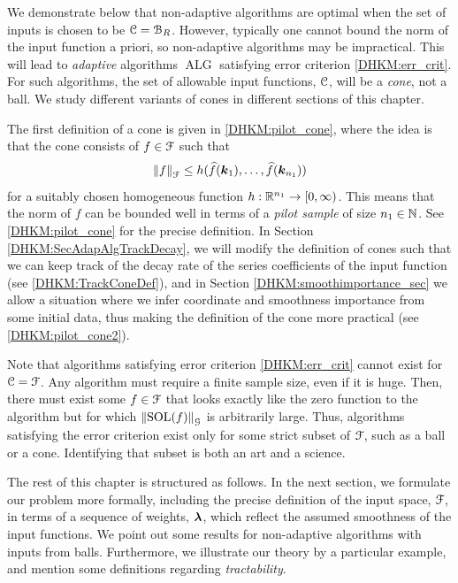 \documentclass[USenglish]{article}
\theoremstyle{dgthm}
\theoremstyle{dgthm}
\theoremstyle{dgthm}
\theoremstyle{dgthm}
\theoremstyle{dgdef}
\theoremstyle{definition}
\DeclareMathOperator{\DHKMSOL}{SOL}
\DeclareMathOperator{\DHKMALG}{ALG}
\newcommand{\DHKMhf}{\widehat{f}}
\newcommand{\DHKMnorm}[2][{}]{\ensuremath{\left \lVert #2 \right \rVert}_{#1}}
\begin{document}
We demonstrate below that non-adaptive algorithms are optimal when the set of inputs is chosen to be ${\mathcal{C}} = {\mathcal{B}}_R$. However, typically one cannot bound the norm of the input function a priori, so non-adaptive algorithms may be impractical. 
This will lead to \emph{adaptive} algorithms $\DHKMALG$ satisfying error criterion \eqref{DHKM:err_crit}.  For such algorithms, the set of allowable input functions, ${\mathcal{C}}$, will be a \emph{cone}, not a ball. We study different variants of cones in different sections of this chapter. 

The first definition of a cone is given in \eqref{DHKM:pilot_cone}, 
where the idea is that the cone consists of $f\in{\mathcal{F}}$ such that 
$$
  \DHKMnorm[\calF]{f}\le h (\DHKMhf(\bsk_1),\ldots,\DHKMhf (\bsk_{n_1}))
$$
for a suitably chosen homogeneous function $h:{\mathbb{R}}^{n_1}\rightarrow [0,\infty)$. This means that the norm of $f$ can be bounded well in terms of 
a \emph{pilot sample} of size $n_1\in{\mathbb{N}}$. See \eqref{DHKM:pilot_cone} for the precise definition. In Section \ref{DHKM:SecAdapAlgTrackDecay}, we will modify the definition of cones such that we can keep track of the decay rate of the series coefficients of the input function (see \eqref{DHKM:TrackConeDef}), 
and in Section \ref{DHKM:smoothimportance_sec} we allow a situation 
where we infer coordinate and smoothness importance from some initial data, thus making the definition of the cone more practical (see  
\eqref{DHKM:pilot_cone2}).

Note that algorithms satisfying error criterion \eqref{DHKM:err_crit} cannot exist for ${\mathcal{C}} = {\mathcal{F}}$. Any algorithm must require a finite sample size, even if it is huge.  Then, there must exist some $f \in {\mathcal{F}}$ that looks exactly like the zero function to the algorithm but for which $\DHKMnorm[\calG]{\DHKMSOL(f)}$ is arbitrarily large.  Thus, algorithms satisfying the error criterion  exist only for some strict subset of ${\mathcal{F}}$, such as a ball or a cone.  Identifying that subset is both an art and a science.

The rest of this chapter is structured as follows. In the next section, we formulate our problem more formally, including the precise definition of the input space, ${\mathcal{F}}$, in terms of a sequence of weights, ${\boldsymbol{\lambda}}$, which reflect the assumed smoothness of the input functions.  We point out some results for non-adaptive algorithms with inputs from balls. Furthermore, we illustrate our theory by 
a particular example, and mention some definitions regarding \emph{tractability}. 
\end{document}
